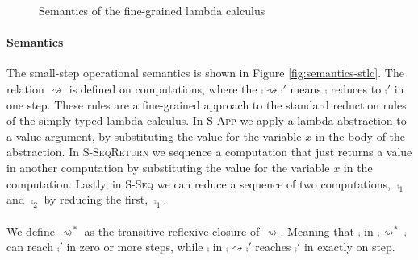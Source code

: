 {%

\begin{figure}
\caption{Semantics of the fine-grained lambda calculus}
\centering
{}
\end{figure}

\paragraph{Semantics}
The small-step operational semantics is shown in Figure \ref{fig:semantics-stlc}.
The relation $\rightsquigarrow$ is defined on computations, where the $\comp \rightsquigarrow \comp'$ means $\comp$ reduces to $\comp'$ in one step.
These rules are a fine-grained approach to the standard reduction rules of the simply-typed lambda calculus.
In {\footnotesize\textsc{S-App}} we apply a lambda abstraction to a value argument, by substituting the value for the variable $x$ in the body of the abstraction.
In {\footnotesize\textsc{S-SeqReturn}} we sequence a computation that just returns a value in another computation by substituting the value for the variable $x$ in the computation.
Lastly, in {\footnotesize\textsc{S-Seq}} we can reduce a sequence of two computations, $\comp_1$ and $\comp_2$ by reducing the first, $\comp_1$.
\\\\
We define $\rightsquigarrow^*$ as the transitive-reflexive closure of $\rightsquigarrow$.
Meaning that $\comp$ in $\comp \rightsquigarrow^* \comp$ can reach $\comp'$ in zero or more steps, while $\comp$ in $\comp \rightsquigarrow \comp'$ reaches $\comp'$ in exactly on step.


}
